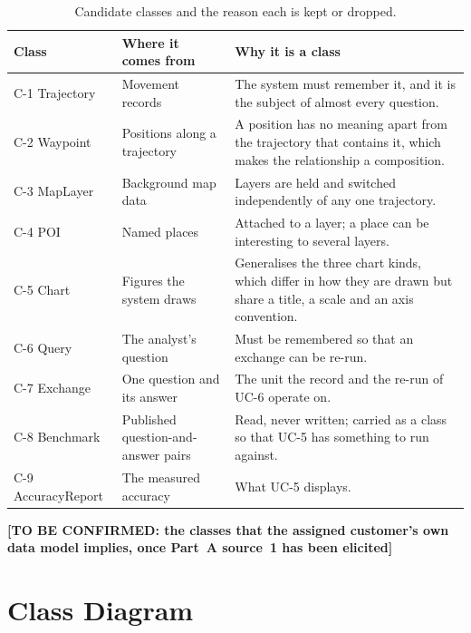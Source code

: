 \documentclass[12pt,a4paper]{report}
\newcommand{\tbd}[1]{{\color{red}\textbf{[TO BE CONFIRMED: #1]}}}
\begin{document}
\begin{table}[H]
  \centering
  \caption{Candidate classes and the reason each is kept or dropped.}
  \label{tab:classes}
  \setlength{\tabcolsep}{4.5pt}
  \begin{tabular}{@{}>{\raggedright\arraybackslash}p{2.8cm}
                    >{\raggedright\arraybackslash}p{5.2cm}
                    >{\raggedright\arraybackslash}p{6.7cm}@{}}
    \toprule[1.5pt]
    \textbf{Class} & \textbf{Where it comes from} & \textbf{Why it is a
      class} \\
    \midrule
    C-1 Trajectory & Movement records & The system must remember it, and it
      is the subject of almost every question. \\
    \addlinespace
    C-2 Waypoint & Positions along a trajectory & A position has no meaning
      apart from the trajectory that contains it, which makes the
      relationship a composition. \\
    \addlinespace
    C-3 MapLayer & Background map data & Layers are held and switched
      independently of any one trajectory. \\
    \addlinespace
    C-4 POI & Named places & Attached to a layer; a place can be
      interesting to several layers. \\
    \addlinespace
    C-5 Chart & Figures the system draws & Generalises the three chart
      kinds, which differ in how they are drawn but share a title, a scale
      and an axis convention. \\
    \addlinespace
    C-6 Query & The analyst's question & Must be remembered so that an
      exchange can be re-run. \\
    \addlinespace
    C-7 Exchange & One question and its answer & The unit the record and
      the re-run of UC-6 operate on. \\
    \addlinespace
    C-8 Benchmark & Published question-and-answer pairs & Read, never
      written; carried as a class so that UC-5 has something to run
      against. \\
    \addlinespace
    C-9 AccuracyReport & The measured accuracy & What UC-5 displays. \\
    \bottomrule[1.5pt]
  \end{tabular}
\end{table}

\tbd{the classes that the assigned customer's own data model implies, once
Part~A source~1 has been elicited}

\section{Class Diagram}
\label{sec:class-diagram}
\end{document}
